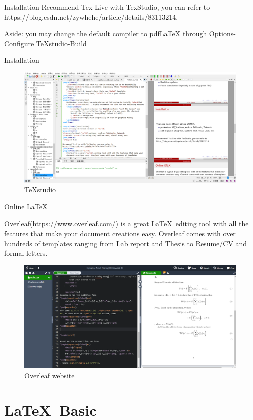 \documentclass[11pt]{beamer}
\begin{document}
\begin{CJK*}{UTF8}{gkai}
\begin{frame}{Installation}
Recommend Tex Live with TexStudio, you can refer to https://blog.csdn.net/zywhehe/article/details/83113214. 

\vskip 0.75cm

Aside: you may change the default compiler to pdfLaTeX through Options-Configure TeXstudio-Build
\end{frame}

\begin{frame}{Installation}
 \begin{figure}
 	\centering
 	\includegraphics[width=0.85\linewidth]{figs/TeXstudio}
 	\caption{TeXstudio}
 	\label{fig:texstudio}
 \end{figure}
 
\end{frame}
\begin{frame}{Online \LaTeX}
	
	Overleaf(https://www.overleaf.com/) is a great \LaTeX\ editing tool with all the features that make your document creations easy. Overleaf comes with over hundreds of templates ranging from Lab report and Thesis to Resume/CV and formal letters. 
\begin{figure}
	\centering
	\includegraphics[width=0.7\linewidth]{figs/overleaf}
	\caption{Overleaf website}
	\label{fig:overleaf}
\end{figure}
\end{frame}


\section{\LaTeX\ Basic}



\end{CJK*}
\end{document}
